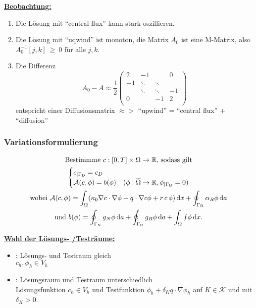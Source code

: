 \underline{\textbf{Beobachtung:}}
\begin{enumerate}
	\item Die Lösung mit \enquote{central flux} kann stark oszillieren.
	\item Die Lösung mit \enquote{uqwind} ist monoton, die Matrix $ A_0 $ ist eine M-Matrix, also $ A_0^{-1}[j,k]~\geq~0 $ für alle $ j,k $.
	\item Die Differenz
	\[ A_0 - A \approx \frac{1}{2}
	\begin{pmatrix} 
	2 & -1 & & 0\\
	-1& \ddots &\ddots & \\
	  & \ddots& \ddots & -1\\	
	0 & & -1 & 2\\		
	\end{pmatrix} \] 
	entspricht einer Diffusionsmatrix $ \approx> $ \enquote{upwind} = \enquote{central flux} + \enquote{diffusion}
\end{enumerate}

\subsubsection{Variationsformulierung}
\begin{gather*}
	\text{Bestimmme } c:[0,T] \times \Omega \to \mathbb{R} \text{, sodass gilt}\\
	\begin{cases}
		c_{|\Gamma_{\text{D}}} = c_D &\\
		\mathcal{A}(c,\phi) = b(\phi) &(\phi: \overline{\Omega} \to \mathbb{R}, \phi_{|\Gamma_{\text{D}}} = 0)
	\end{cases}\\
	\text{wobei } \mathcal{A}(c,\phi) = \int_\Omega (\kappa_0 \nabla c \cdot \nabla \phi + q \cdot \nabla c \phi + r \, c \, \phi) \mathop{}\!\mathrm{d} x + \oint_{\Gamma_{\text{R}}} \alpha_R \phi \mathop{}\!\mathrm{d} a\\
	\text{und } b(\phi) = \oint_{\Gamma_{\text{N}}} g_N \phi \mathop{}\!\mathrm{d} a + \oint_{\Gamma_{\text{R}}} g_R \phi \mathop{}\!\mathrm{d} a + \int_\Omega f \phi \mathop{}\!\mathrm{d} x.
\end{gather*}

\underline{\textbf{Wahl der Lösungs- /Testräume:}}
\begin{itemize}
	\item {}: Lösungs- und Testraum gleich\\ $ c_h, \phi_h \in V_h$
	\item {}: Lösungsraum und Testraum unterschiedlich\\ Lösungsfunktion $ c_h \in V_h $ und Testfunktion $ \phi_h + \delta_K q \cdot \nabla \phi_h $ auf $ K \in \mathcal{K} $ und mit $ \delta_K > 0 $.
\end{itemize}

